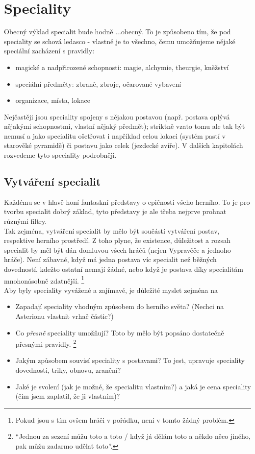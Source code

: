 \documentclass[../main.tex]{subfiles}
\begin{document}
\chapter{Speciality}

Obecný výklad specialit bude hodně ...obecný. To je způsobeno tím, že pod speciality se schová ledasco - vlastně je to všechno, čemu umožňujeme nějaké speciální zacházení s pravidly:

\begin{itemize}
\item magické a nadpřirozené schopnosti: magie, alchymie, theurgie, kněžství
\item speciální předměty: zbraně, zbroje, očarované vybavení
\item organizace, místa, lokace
\end{itemize}

Nejčastěji jsou speciality spojeny s nějakou postavou (např. postava oplývá nějakými schopnostmi, vlastní nějaký předmět); striktně vzato tomu ale tak být nemusí a jako specialitu ošetřovat i například celou lokaci (systém pastí v starověké pyramidě) či postavu jako celek (jezdecké zvíře). V dalších kapitolách rozvedeme tyto speciality podrobněji.

\section{Vytváření specialit}
\label{sec:spec-vytvareni}
Každému se v hlavě honí fantaskní představy o epičnosti všeho herního. To je pro tvorbu specialit dobrý základ, tyto představy je ale třeba nejprve prohnat různými filtry.\\
Tak zejména, vytváření specialit by mělo být součástí vytváření postav, respektive herního prostředí. Z toho plyne, že existence, důležitost a rozsah specialit by měl být dán domluvou všech hráčů (nejen Vypravěče a jednoho hráče). Není zábavné, když má jedna postava víc specialit než běžných dovedností, kdežto ostatní nemají žádné, nebo když je postava díky specialitám mnohonásobně zdatnější. \footnote{Pokud jsou s tím ovšem hráči v pořádku, není v tomto žádný problém.}\\
Aby byly speciality vyvážené a zajímavé, je důležité myslet zejména na

\begin{itemize}
\item Zapadají speciality vhodným způsobem do herního světa? (Nechci na Asterionu vlastnit vrhač částic?)
\item Co \textit{přesně} speciality umožňují? Toto by mělo být popsáno dostatečně přesnými pravidly. \footnote{``Jednou za sezení můžu toto a toto / když já dělám toto a někdo něco jiného, pak můžu zadarmo udělat toto''.}
\item Jakým způsobem souvisí speciality s postavami? To jest, upravuje speciality dovednosti, triky, obnovu, zranění?
\item Jaké je svolení (jak je možné, že specialitu vlastním?) a jaká je cena speciality (čím jsem zaplatil, že ji vlastním)?
\end{itemize}
\end{document}
